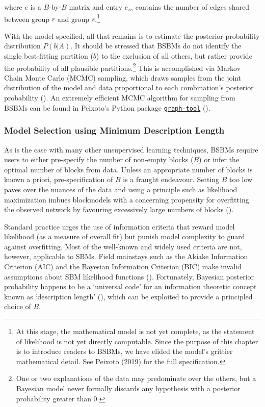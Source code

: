 \documentclass[
  12pt,
  a4paper,
  DIV=11,
  numbers=noendperiod,
  twoside,
  open=any]{scrartcl}
\begin{document}
where \(e\) is a \(B\)-by-\(B\) matrix and entry \(e_{rs}\) contains the
number of edges shared between group \(r\) and group \(s\).\footnote{At
  this stage, the mathematical model is not yet complete, as the
  statement of likelihood is not yet directly computable. Since the
  purpose of this chapter is to introduce readers to BSBMs, we have
  elided the model's grittier mathematical detail. See Peixoto (2019)
  for the full specification.}

With the model specified, all that remains is to estimate the posterior
probability distribution \(P(b|A)\). It should be stressed that BSBMs do
not identify the single best-fitting partition (\(b\)) to the exclusion
of all others, but rather provide the probability of all plausible
partitions.\footnote{One or two explanations of the data may predominate
  over the others, but a Bayesian model never formally discards any
  hypothesis with a posterior probability greater than 0.} This is
accomplished via Markov Chain Monte Carlo (MCMC) sampling, which draws
samples from the joint distribution of the model and data proportional
to each combination's posterior probability
(). An extremely
efficient MCMC algorithm for sampling from BSBMs can be found in
Peixoto's Python package
\href{https://graph-tool.skewed.de}{\texttt{graph-tool}}
().

\subsubsection{Model Selection using Minimum Description
Length}\label{model-selection-using-minimum-description-length}

As is the case with many other unsupervised learning techniques, BSBMs
require users to either pre-specify the number of non-empty blocks
(\(B\)) or infer the optimal number of blocks from data. Unless an
appropriate number of blocks is known a priori, pre-specification of
\(B\) is a fraught endeavour. Setting \(B\) too low paves over the
nuances of the data and using a principle such as likelihood
maximization imbues blockmodels with a concerning propensity for
overfitting the observed network by favouring excessively large numbers
of blocks ().

Standard practice urges the use of information criteria that reward
model likelihood (as a measure of overall fit) but punish model
complexity to guard against overfitting. Most of the well-known and
widely used criteria are not, however, applicable to SBMs. Field
mainstays such as the Akiake Information Criterion (AIC) and the
Bayesian Information Criterion (BIC) make invalid assumptions about SBM
likelihood functions (). Fortunately, Bayesian posterior probability happens to be a
`universal code' for an information theoretic concept known as
`description length' (), which can be exploited to provide a principled choice of \(B\).
\end{document}
